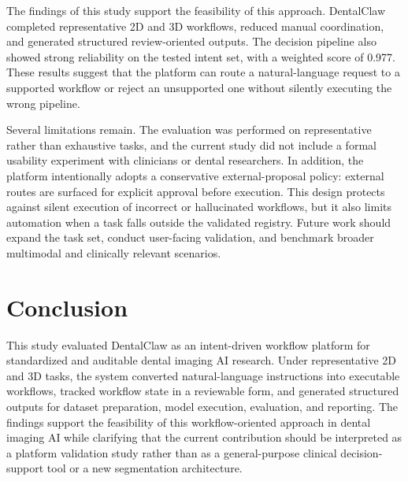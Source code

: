 \documentclass[final,5p,times,twocolumn]{elsarticle}
\begin{document}
The findings of this study support the feasibility of this approach. DentalClaw completed representative 2D and 3D workflows, reduced manual coordination, and generated structured review-oriented outputs. The decision pipeline also showed strong reliability on the tested intent set, with a weighted score of 0.977. These results suggest that the platform can route a natural-language request to a supported workflow or reject an unsupported one without silently executing the wrong pipeline.

Several limitations remain. The evaluation was performed on representative rather than exhaustive tasks, and the current study did not include a formal usability experiment with clinicians or dental researchers. In addition, the platform intentionally adopts a conservative external-proposal policy: external routes are surfaced for explicit approval before execution. This design protects against silent execution of incorrect or hallucinated workflows, but it also limits automation when a task falls outside the validated registry. Future work should expand the task set, conduct user-facing validation, and benchmark broader multimodal and clinically relevant scenarios.

\section{Conclusion}
This study evaluated DentalClaw as an intent-driven workflow platform for standardized and auditable dental imaging AI research. Under representative 2D and 3D tasks, the system converted natural-language instructions into executable workflows, tracked workflow state in a reviewable form, and generated structured outputs for dataset preparation, model execution, evaluation, and reporting. The findings support the feasibility of this workflow-oriented approach in dental imaging AI while clarifying that the current contribution should be interpreted as a platform validation study rather than as a general-purpose clinical decision-support tool or a new segmentation architecture.

\newpage
\footnotesize


\end{document}
